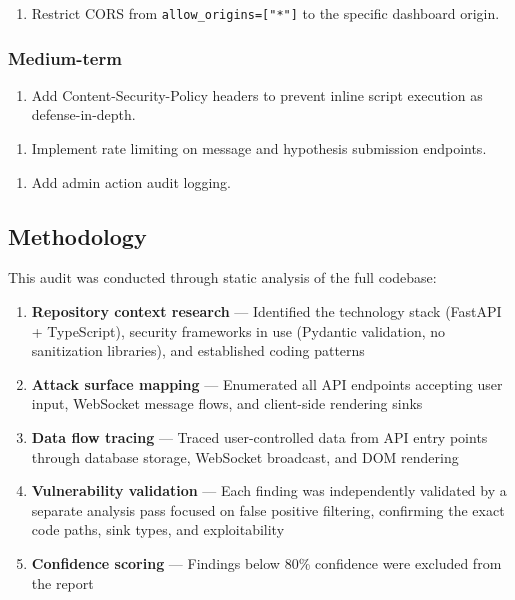 \documentclass[twocolumn,10pt,letterpaper]{article}
\begin{document}
\begin{enumerate}
\setlength{\itemsep}{0pt}
\setlength{\parskip}{0pt}
  \item Restrict CORS from \texttt{allow\_origins=["*"]} to the specific dashboard origin.
\end{enumerate}

\subsubsection{Medium-term}

\begin{enumerate}
\setlength{\itemsep}{0pt}
\setlength{\parskip}{0pt}
  \item Add Content-Security-Policy headers to prevent inline script execution as defense-in-depth.
\end{enumerate}

\begin{enumerate}
\setlength{\itemsep}{0pt}
\setlength{\parskip}{0pt}
  \item Implement rate limiting on message and hypothesis submission endpoints.
\end{enumerate}

\begin{enumerate}
\setlength{\itemsep}{0pt}
\setlength{\parskip}{0pt}
  \item Add admin action audit logging.
\end{enumerate}

\subsection{Methodology}

This audit was conducted through static analysis of the full codebase:


\begin{enumerate}
\setlength{\itemsep}{0pt}
\setlength{\parskip}{0pt}
  \item \textbf{Repository context research} — Identified the technology stack (FastAPI + TypeScript), security frameworks in use (Pydantic validation, no sanitization libraries), and established coding patterns
  \item \textbf{Attack surface mapping} — Enumerated all API endpoints accepting user input, WebSocket message flows, and client-side rendering sinks
  \item \textbf{Data flow tracing} — Traced user-controlled data from API entry points through database storage, WebSocket broadcast, and DOM rendering
  \item \textbf{Vulnerability validation} — Each finding was independently validated by a separate analysis pass focused on false positive filtering, confirming the exact code paths, sink types, and exploitability
  \item \textbf{Confidence scoring} — Findings below 80\% confidence were excluded from the report
\end{enumerate}


\balance
\end{document}
